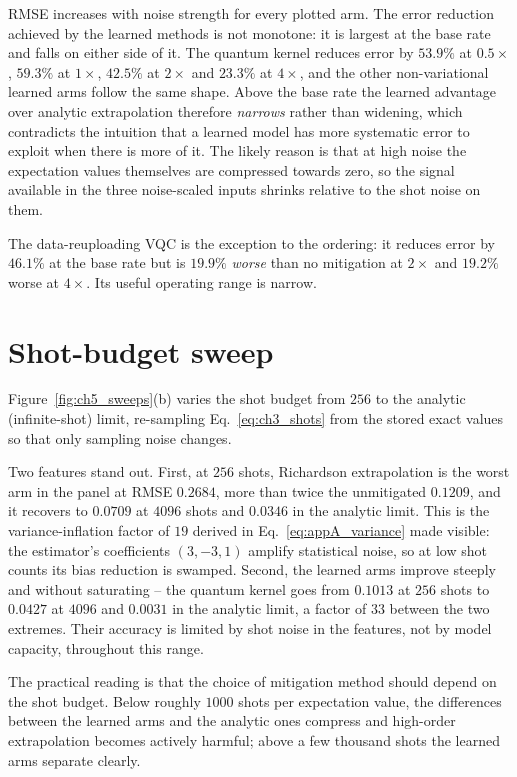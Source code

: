 \documentclass[Thesis.tex]{subfiles}
\begin{document}
RMSE increases with noise strength for every plotted arm. The error reduction
achieved by the learned methods is not monotone: it is largest at the base rate and
falls on either side of it. The quantum kernel reduces error by $53.9\%$ at
$0.5\times$, $59.3\%$ at $1\times$, $42.5\%$ at $2\times$ and $23.3\%$ at
$4\times$, and the other non-variational learned arms follow the same shape. Above
the base rate the learned advantage over analytic extrapolation therefore
\emph{narrows} rather than widening,
which contradicts the intuition that a learned model has more systematic error to
exploit when there is more of it. The likely reason is that at high noise the
expectation values themselves are compressed towards zero, so the signal available
in the three noise-scaled inputs shrinks relative to the shot noise on them.

The data-reuploading VQC is the exception to the ordering: it reduces error by
$46.1\%$ at the base rate but is $19.9\%$ \emph{worse} than no mitigation at
$2\times$ and $19.2\%$ worse at $4\times$. Its useful operating range is narrow.

\section{Shot-budget sweep}\label{sec:ch5_shots}

Figure~\ref{fig:ch5_sweeps}(b) varies the shot budget from $256$ to the analytic
(infinite-shot) limit, re-sampling Eq.~\eqref{eq:ch3_shots} from the stored exact
values so that only sampling noise changes.

Two features stand out. First, at $256$ shots, Richardson extrapolation is the worst
arm in the panel at RMSE $0.2684$, more than twice the unmitigated $0.1209$, and it
recovers to $0.0709$ at $4096$ shots and $0.0346$ in the analytic limit. This is the
variance-inflation factor of $19$ derived in Eq.~\eqref{eq:appA_variance} made
visible: the estimator's coefficients $(3, -3, 1)$ amplify statistical noise, so at
low shot counts its bias reduction is swamped. Second, the learned arms improve
steeply and without saturating -- the quantum kernel goes from $0.1013$ at $256$
shots to $0.0427$ at $4096$ and $0.0031$ in the analytic limit, a factor of $33$
between the two extremes. Their accuracy is limited by shot noise in the features,
not by model capacity, throughout this range.

The practical reading is that the choice of mitigation method should depend on the
shot budget. Below roughly $1000$ shots per expectation value, the differences
between the learned arms and the analytic ones compress and high-order extrapolation
becomes actively harmful; above a few thousand shots the learned arms separate
clearly.
\end{document}
